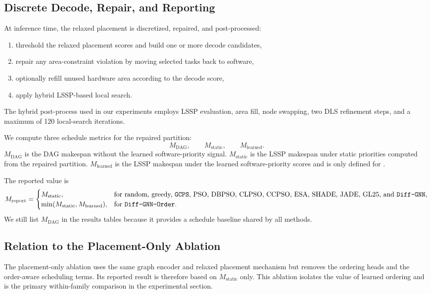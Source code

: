 \subsection{Discrete Decode, Repair, and Reporting}
At inference time, the relaxed placement is discretized, repaired, and post-processed:
\begin{enumerate}
\item threshold the relaxed placement scores and build one or more decode candidates,
\item repair any area-constraint violation by moving selected tasks back to software,
\item optionally refill unused hardware area according to the decode score,
\item apply hybrid LSSP-based local search.
\end{enumerate}
The hybrid post-process used in our experiments employs LSSP evaluation, area fill, node swapping, two DLS refinement steps, and a maximum of 120 local-search iterations.

We compute three schedule metrics for the repaired partition:
\begin{equation}
M_{\mathrm{DAG}},
\qquad
M_{\mathrm{static}},
\qquad
M_{\mathrm{learned}}.
\end{equation}
$M_{\mathrm{DAG}}$ is the DAG makespan without the learned software-priority signal. $M_{\mathrm{static}}$ is the LSSP makespan under static priorities computed from the repaired partition. $M_{\mathrm{learned}}$ is the LSSP makespan under the learned software-priority scores and is only defined for \diffgnnorder.

The reported value is
\begin{equation}
M_{\mathrm{report}}=
\begin{cases}
M_{\mathrm{static}}, & \text{for random, greedy, \texttt{GCPS}, PSO, DBPSO, CLPSO, CCPSO, ESA, SHADE, JADE, GL25, and \texttt{Diff-GNN},}\\
\min(M_{\mathrm{static}}, M_{\mathrm{learned}}), & \text{for \texttt{Diff-GNN-Order}.}
\end{cases}
\label{eq:report_metric}
\end{equation}
We still list $M_{\mathrm{DAG}}$ in the results tables because it provides a schedule baseline shared by all methods.

\subsection{Relation to the Placement-Only Ablation}
The placement-only \diffgnn ablation uses the same graph encoder and relaxed placement mechanism but removes the ordering heads and the order-aware scheduling terms. Its reported result is therefore based on $M_{\mathrm{static}}$ only. This ablation isolates the value of learned ordering and is the primary within-family comparison in the experimental section.
